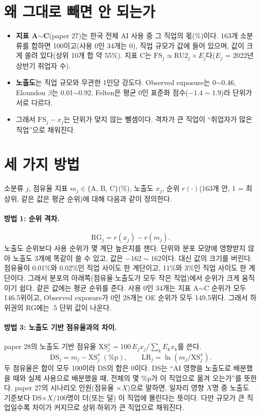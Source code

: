\documentclass[11pt]{article}
\begin{document}
\section{왜 그대로 빼면 안 되는가}

\begin{itemize}[leftmargin=*]
  \item \textbf{지표 A$\sim$C}(paper 27)는 한국 전체 AI 사용 중 그 직업의 몫(\%)이다. 163개 소분류를 합하면 100이고(사용 0인 34개는 0), 직업 규모가 값에 들어 있으며, 값이 크게 쏠려 있다(상위 10개 합 약 55\%). 지표 C는 $\mathrm{FS}_j \propto \mathrm{RU2}_j \times E_j$다($E_j$ = 2022년 상반기 취업자 수).
  \item \textbf{노출도}는 직업 규모와 무관한 1인당 강도다. Observed exposure는 0$\sim$0.46, Eloundou $\beta$는 0.01$\sim$0.92, Felten은 평균 0인 표준화 점수($-1.4\sim1.9$)라 단위가 서로 다르다.
  \item 그래서 $\mathrm{FS}_j - x_j$는 단위가 맞지 않는 뺄셈이다. 격차가 큰 직업이 ``취업자가 많은 직업''으로 채워진다.
\end{itemize}

\section{세 가지 방법}

소분류 $j$, 점유율 지표 $m_j \in \{\text{A, B, C}\}$(\%), 노출도 $x_j$, 순위 $r(\cdot)$(163개 안, 1 = 최상위, 같은 값은 평균 순위)에 대해 다음과 같이 정의한다.

\paragraph{방법 1: 순위 격차.}
\[
  \mathrm{RG}_j = r(x_j) - r(m_j).
\]
노출도 순위보다 사용 순위가 몇 계단 높은지를 잰다. 단위와 분포 모양에 영향받지 않아 노출도 3개에 똑같이 쓸 수 있고, 값은 $-162\sim162$이다. 대신 값의 크기를 버린다. 점유율이 0.01\%와 0.02\%인 직업 사이도 한 계단이고, 11\%와 3\%인 직업 사이도 한 계단이다. 그래서 분포의 아래쪽(점유율$\cdot$노출도가 모두 작은 직업)에서 순위가 크게 움직이기 쉽다. 같은 값에는 평균 순위를 준다. 사용 0인 34개는 지표 A$\sim$C 순위가 모두 146.5위이고, Observed exposure가 0인 28개는 OE 순위가 모두 149.5위다. 그래서 하위권의 RG에는 .5 단위 값이 나온다.

\paragraph{방법 3: 노출도 기반 점유율과의 차이.} paper 28의 노출도 기반 점유율 $\mathrm{XS}^x_j = 100\,E_j x_j / \sum_k E_k x_k$를 쓴다.
\[
  \mathrm{DS}_j = m_j - \mathrm{XS}^x_j \ (\%\text{p}), \qquad \mathrm{LR}_j = \ln\!\left(m_j / \mathrm{XS}^x_j\right).
\]
두 점유율은 합이 모두 100이라 DS의 합은 0이다. DS는 ``AI 영향을 노출도로 배분했을 때와 실제 사용으로 배분했을 때, 전체의 몇 \%p가 이 직업으로 옮겨 오는가''를 뜻한다. paper 27의 시나리오 인원(점유율 $\times X$)으로 말하면, 일자리 영향 $X$명 중 노출도 기준보다 DS$\times X/100$명이 더(또는 덜) 이 직업에 몰린다는 뜻이다. 다만 규모가 큰 직업일수록 차이가 커지므로 상위$\cdot$하위가 큰 직업으로 채워진다.
\end{document}

